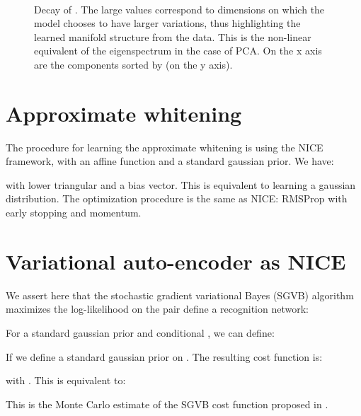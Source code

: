 \documentclass{article}
\begin{document}
\begin{figure}[t]
    \centering {}
    \\
    \caption{Decay of . The large values correspond to dimensions
        on which the model chooses to have larger variations, thus highlighting
        the learned manifold structure from the data. This is the non-linear equivalent
        of the eigenspectrum in the case of PCA. On the x axis are the components  sorted
        by  (on the y axis).}
    \label{fig:decay}
\end{figure}

\section{Approximate whitening}
The procedure for learning the approximate whitening is using the NICE framework, with an
affine function and a standard gaussian prior. We have:

with  lower triangular and  a bias vector. This is equivalent to learning a gaussian distribution.
The optimization procedure is the same as NICE: RMSProp with early stopping and momentum.

\section{Variational auto-encoder as NICE}
\label{appendix:vae}
We assert here that the stochastic gradient variational Bayes (SGVB) algorithm maximizes the log-likelihood on the pair \citep{Kingma+Welling-ICLR2014} define a recognition network:


For a standard gaussian prior  and conditional , we can define:



If we define a standard gaussian prior on .
The resulting cost function is:

with . This is equivalent to:

This is the Monte Carlo estimate
of the SGVB cost function
proposed in \citep{Kingma+Welling-ICLR2014}.
\end{document}
